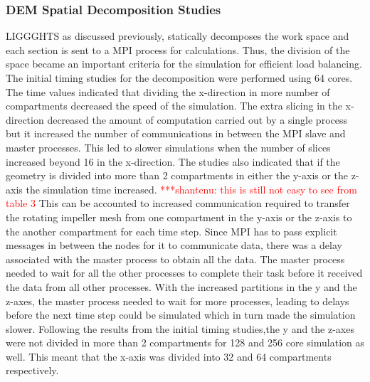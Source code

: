 \documentclass[preprint,11pt,authoryear]{elsarticle}
\newcommand{\jhanote}[1]{ {\textcolor{red} { ***shantenu: #1 }}}
\newcommand{\csnote}[1]{ {\textcolor{blue} { ***chaitanya: #1 }}}
\newcommand{\gpnote}[1]{{\textcolor{green} {***giannis: #1}}}
\newcommand{\jhanote}[1]{ {\textcolor{red} { ***shantenu: #1 }}}
\newcommand{\csnote}[1]{}
\newcommand{\gpnote}[1]{}
\begin{document}
\subsubsection{DEM Spatial Decomposition Studies}
LIGGGHTS as discussed previously, statically decomposes the work space and
each section is sent to a MPI process for calculations. Thus, the division of
the space became an important criteria for the simulation for efficient load
balancing. The initial timing studies for the decomposition were performed using 64
cores. The time values indicated that dividing the
x-direction in more number of compartments decreased the speed of the simulation. 
The extra slicing in the x-direction decreased the amount of computation carried out by 
a single process but it increased the number of communications in between the MPI slave 
and master processes. This led to slower simulations when the number of slices 
increased beyond 16 in the x-direction. 
The studies also indicated that if the geometry is divided into more than 2 compartments 
in either the y-axis or the z-axis the simulation time increased. 
\jhanote{this is still not easy to see from table 3}
This can be accounted to increased communication required to transfer 
the rotating impeller mesh from one compartment in the y-axis or the z-axis 
to the another compartment for each time step. Since MPI has to pass explicit 
messages in between the nodes for it to communicate data, there was a delay 
associated with the master process to obtain all the data. The master process
needed to wait for all the other processes to complete their task before it received 
the data from all other processes. With the increased 
partitions in the y and the z-axes, the master process needed to wait for more 
processes, leading to delays before the next time step could be simulated which 
in turn made the simulation slower.
Following the results from the initial timing studies,the y and the z-axes were not divided
in more than 2 compartments for 128 and 256 core simulation as well. This
meant that the x-axis was divided into 32 and 64 compartments respectively. 
\end{document}
